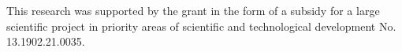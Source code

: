 \documentclass[article,authoryear,jpm]{beg_39}             %
\begin{document}








\acknowledgements

This research was supported by the grant in the form of a subsidy for a large scientific project in priority areas of scientific and technological development No. 13.1902.21.0035.




\end{document}
